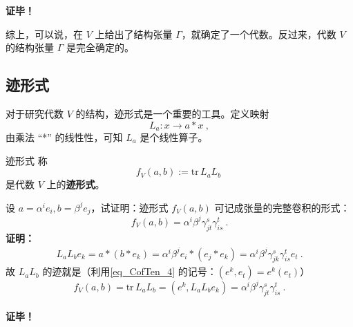 \textbf{证毕！}

综上，可以说，在 $V$ 上给出了结构张量 $\Gamma$，就确定了一个代数。反过来，代数 $V$ 的结构张量 $\Gamma$ 是完全确定的。
\subsection{迹形式}
对于研究代数 $V$ 的结构，迹形式是一个重要的工具。定义映射
\begin{equation}
L_a:x\rightarrow a*x~,
\end{equation}
由乘法 “*” 的线性性，可知 $L_a$ 是个线性算子。
\begin{definition}{迹形式}
称
\begin{equation}
f_V(a,b):=\mathrm{tr}\, L_aL_b~
\end{equation}
是代数 $V$ 上的\textbf{迹形式}。
\end{definition}
\begin{example}{}\label{ex_STAlg_1}
设 $a=\alpha^i e_i,b=\beta^j e_j$，试证明：迹形式 $f_V(a,b)$ 可记成张量的完整卷积的形式：
\begin{equation}
f_V(a,b)=\alpha^i\beta^j\gamma_{jt}^s\gamma_{is}^t~.
\end{equation}
\textbf{证明：}
\begin{equation}
\begin{aligned}
L_aL_b e_k=a*(b*e_k)=\alpha^i\beta^je_i*(e_j*e_k)=\alpha^i\beta^j\gamma_{jk}^s \gamma_{is}^t e_t~.
\end{aligned}
\end{equation}
故 $L_aL_b$ 的迹就是（利用\autoref{eq_CofTen_4} 的记号：$(e^k,e_t)=e^k(e_t)$）
\begin{equation}
f_V(a,b)=\mathrm{tr}\, L_a L_b=(e^k,L_aL_b e_k)=\alpha^i\beta^j\gamma_{jt}^s \gamma_{is}^t~.
\end{equation}\\
\textbf{证毕！}
\end{example}

